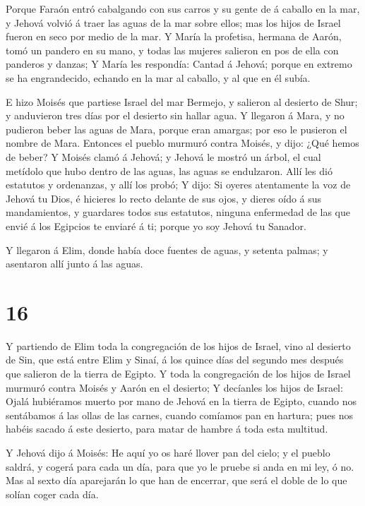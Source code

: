  Porque Faraón entró cabalgando con sus carros y su gente
de á caballo en la mar, y Jehová volvió á traer las aguas de la mar
sobre ellos; mas los hijos de Israel fueron en seco por medio de la mar.
 Y María la profetisa, hermana de Aarón, tomó un pandero en
su mano, y todas las mujeres salieron en pos de ella con panderos y
danzas;  Y María les respondía: Cantad á Jehová; porque en
extremo se ha engrandecido, echando en la mar al caballo, y al que en él
subía.

 E hizo Moisés que partiese Israel del mar Bermejo, y
salieron al desierto de Shur; y anduvieron tres días por el desierto sin
hallar agua.  Y llegaron á Mara, y no pudieron beber las
aguas de Mara, porque eran amargas; por eso le pusieron el nombre de
Mara.  Entonces el pueblo murmuró contra Moisés, y dijo:
¿Qué hemos de beber?  Y Moisés clamó á Jehová; y Jehová le
mostró un árbol, el cual metídolo que hubo dentro de las aguas, las
aguas se endulzaron. Allí les dió estatutos y ordenanzas, y allí los
probó;  Y dijo: Si oyeres atentamente la voz de Jehová tu
Dios, é hicieres lo recto delante de sus ojos, y dieres oído á sus
mandamientos, y guardares todos sus estatutos, ninguna enfermedad de las
que envié á los Egipcios te enviaré á ti; porque yo soy Jehová tu
Sanador.

 Y llegaron á Elim, donde había doce fuentes de aguas, y
setenta palmas; y asentaron allí junto á las aguas.

\hypertarget{section-15}{%
\section{16}\label{section-15}}

 Y partiendo de Elim toda la congregación de los hijos de
Israel, vino al desierto de Sin, que está entre Elim y Sinaí, á los
quince días del segundo mes después que salieron de la tierra de Egipto.
 Y toda la congregación de los hijos de Israel murmuró
contra Moisés y Aarón en el desierto;  Y decíanles los hijos
de Israel: Ojalá hubiéramos muerto por mano de Jehová en la tierra de
Egipto, cuando nos sentábamos á las ollas de las carnes, cuando comíamos
pan en hartura; pues nos habéis sacado á este desierto, para matar de
hambre á toda esta multitud.

 Y Jehová dijo á Moisés: He aquí yo os haré llover pan del
cielo; y el pueblo saldrá, y cogerá para cada un día, para que yo le
pruebe si anda en mi ley, ó no.  Mas al sexto día aparejarán
lo que han de encerrar, que será el doble de lo que solían coger cada
día.

